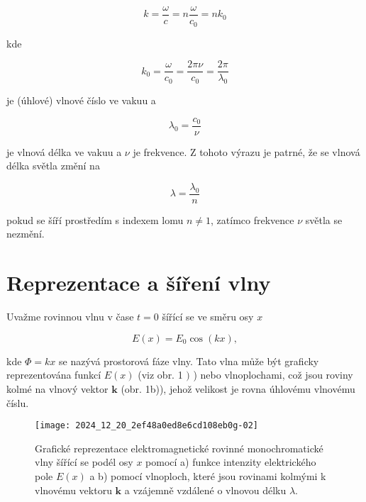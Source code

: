 \documentclass[czech,11pt,a4paper]{article}
\begin{document}
\begin{multicols}{2}
	\begin{equation}
		k=\frac{\omega}{c}=n \frac{\omega}{c_{0}}=n k_{0}
	\end{equation}
	
	
	kde
	
	\begin{equation}
		k_{0}=\frac{\omega}{c_{0}}=\frac{2 \pi \nu}{c_{0}}=\frac{2 \pi}{\lambda_{0}}
	\end{equation}
	
	
	je (úhlové) vlnové číslo ve vakuu a
	
	\begin{equation}
		\lambda_{0}=\frac{c_{0}}{\nu}
	\end{equation}
	
	
	je vlnová délka ve vakuu a $\nu$ je frekvence. Z tohoto výrazu je patrné, že se vlnová délka světla změní na
	
	\begin{equation}
		\lambda=\frac{\lambda_{0}}{n}
	\end{equation}
	
	
	pokud se šíří prostředím s indexem lomu $n \neq 1$, zatímco frekvence $\nu$ světla se nezmění.
	
	\section*{Reprezentace a šíření vlny}
	Uvažme rovinnou vlnu v čase $t=0$ šířící se ve směru osy $x$
	
	\begin{equation}
		E(x)=E_{0} \cos (k x),
	\end{equation}
	
	
	kde $\Phi=k x$ se nazývá prostorová fáze vlny. Tato vlna může být graficky reprezentována funkcí $E(x)$ (viz obr. 1 $)$ ) nebo vlnoplochami, což jsou roviny kolmé na vlnový vektor $\boldsymbol{k}$ (obr. 1b)), jehož velikost je rovna úhlovému vlnovému číslu.\\
	
	\begin{figure}[H]
			\texttt{[image: 2024\_12\_20\_2ef48a0ed8e6cd108eb0g-02]}
			\caption{Grafické reprezentace elektromagnetické rovinné monochromatické vlny šířící se podél osy $x$ pomocí a) funkce intenzity elektrického pole $E(x)$ a b) pomocí vlnoploch, které jsou rovinami kolmými k vlnovému vektoru $\boldsymbol{k}$ a vzájemně vzdálené o vlnovou délku $\lambda$.}
	\end{figure}


\end{multicols}
\end{document}
